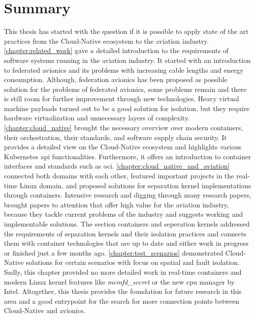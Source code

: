\documentclass[titlepage]{report}
\begin{document}
\section{Summary}
This thesis has started with the question if it is possible to apply state of the art practices from the Cloud-Native ecosystem to the aviation industry. \autoref{chapter:related_work}
gave a detailed introduction to the requirements of software systems running in the aviation industry. It started with an introduction to federated avionics and its problems with increasing
cable lengths and energy consumption. Although, federation avionics has been proposed as possible solution for the problems of federated avionics, some problems remain and there is still
room for further improvement through new technologies. Heavy virtual machine payloads turned out to be a good solution for isolation, but they require hardware virtualization and unnecessary layers
of complexity. \autoref{chapter:cloud_native} brought the necessary overview over modern containers, their orchestration, their standards, and software supply chain security. It provides a detailed
view on the Cloud-Native ecosystem and highlights various Kubernetes \gls{api} functionalities. Furthermore, it offers an introduction to container interfaces and standards such as \gls{oci}.
\autoref{chapter:cloud_native_and_aviation} connected both domains with each other, featured important projects in the real-time Linux domain, and proposed solutions for separation kernel implementations through containers. 
Intensive research and digging through many research papers, brought papers to attention that offer high value for the aviation industry, because they tackle current problems of the industry and suggests working and implementable
solutions. The section containers and seperation kernels addressed the requirements of separation kernels and their isolation practices and connects them with container technologies that are up to date and either
work in progress or finished just a few months ago. \autoref{chapter:test_scenarios} demonstrated Cloud-Native solutions for certain scenarios with focus on spatial and fault isolation. Sadly, this chapter provided
no more detailed work in real-time containers and modern Linux kernel features like \emph{memfd\_secret} or the new \gls{cpu} manager by Intel. Altogether, this thesis provides the foundation for future research
in this area and a good entrypoint for the search for more connection points between Cloud-Native and avionics.
\end{document}
